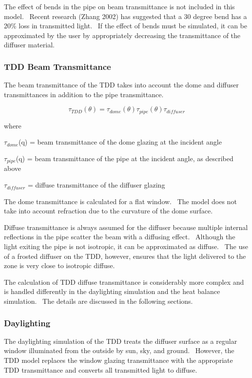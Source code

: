 The effect of bends in the pipe on beam transmittance is not included in this model.~ Recent research (Zhang 2002) has suggested that a 30 degree bend has a 20\% loss in transmitted light.~ If the effect of bends must be simulated, it can be approximated by the user by appropriately decreasing the transmittance of the diffuser material.

\subsubsection{TDD Beam Transmittance}\label{tdd-beam-transmittance}

The beam transmittance of the TDD takes into account the dome and diffuser transmittances in addition to the pipe transmittance.

\begin{equation}
{\tau_{TDD}}(\theta ) = {\tau_{dome}}(\theta ){\tau_{pipe}}(\theta ){\tau_{diffuser}}
\end{equation}

where

\(\tau_{dome}\)(q) = beam transmittance of the dome glazing at the incident angle

\(\tau_{pipe}\)(q) = beam transmittance of the pipe at the incident angle, as described above

\(\tau_{diffuser}\) = diffuse transmittance of the diffuser glazing

The dome transmittance is calculated for a flat window.~ The model does not take into account refraction due to the curvature of the dome surface.

Diffuse transmittance is always assumed for the diffuser because multiple internal reflections in the pipe scatter the beam with a diffusing effect.~ Although the light exiting the pipe is not isotropic, it can be approximated as diffuse.~ The use of a frosted diffuser on the TDD, however, ensures that the light delivered to the zone is very close to isotropic diffuse.

The calculation of TDD diffuse transmittance is considerably more complex and is handled differently in the daylighting simulation and the heat balance simulation.~ The details are discussed in the following sections.

\subsubsection{Daylighting}\label{daylighting}

The daylighting simulation of the TDD treats the diffuser surface as a regular window illuminated from the outside by sun, sky, and ground.~ However, the TDD model replaces the window glazing transmittance with the appropriate TDD transmittance and converts all transmitted light to diffuse.

